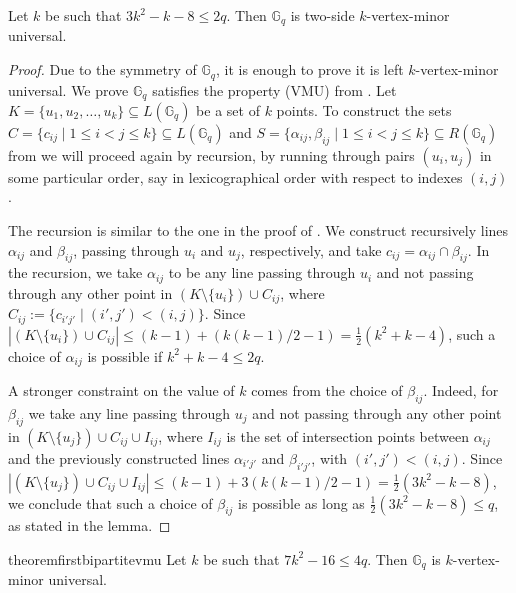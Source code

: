 \documentclass[a4paper,UKenglish,cleveref, autoref, thm-restate]{arxiv}
\newcommand{\ls}{\leqslant}
\newcommand{\G}[1][q]{\mathbb{G}_{#1}}
\begin{document}
\begin{theorem}\label{theo:bipartite-kvmu}
    Let $k$ be such that $3k^2-k-8 \ls 2q$. Then $\G$ is two-side  $k$-vertex-minor universal.
\end{theorem}

\begin{proof}
    Due to the symmetry of $\G$, it is enough to prove it is left $k$-vertex-minor universal. We prove $\G$ satisfies the property (VMU) from . Let  $K = \{u_1, u_2, \dots, u_k\} \subseteq L(\G)$ be a set of $k$  points. To construct the sets
    $C = \{c_{ij} \mid 1 \ls i < j \ls k \} \subseteq L(\G)$ and
    $S = \{\alpha_{ij},\beta_{ij} \mid 1 \ls i < j \ls k \} \subseteq R(\G)$ from  we will proceed again by recursion, by running through pairs $(u_i, u_j)$ in some particular order, say in lexicographical order with respect to indexes $(i,j)$.

    \medskip \noindent The recursion is similar to the one in the proof of .  We construct recursively lines $\alpha_{ij}$ and $\beta_{ij}$, passing through $u_i$ and $u_j$, respectively, and take $c_{ij} = \alpha_{ij} \cap \beta_{ij}$. In the recursion, we  take $\alpha_{ij}$ to be any line passing through $u_{i}$ and not passing through any other point in $\left(K\setminus\{u_{i}\}\right) \cup C_{ij}$, where $C_{ij} := \{ c_{i'j'} \mid (i',j') < (i,j)\}$. Since $|\left(K\setminus\{u_{i}\}\right)\cup C_{ij}| \ls (k-1) + (k(k-1)/2-1) = \frac{1}{2}(k^2+k-4)$, such a choice of $\alpha_{ij}$ is possible if  $k^2+k-4 \ls 2q$.

    \medskip \noindent A stronger constraint on the value of $k$ comes from the choice of $\beta_{ij}$. Indeed, for $\beta_{ij}$ we take any line passing through $u_{j}$ and not passing through any other point in $(K\setminus\{u_{j}\}) \cup C_{ij} \cup I_{ij}$, where $I_{ij}$ is the set of intersection points between $\alpha_{ij}$ and the previously constructed lines $\alpha_{i'j'}$ and $\beta_{i'j'}$, with $(i',j') < (i,j)$. Since $|(K\setminus\{u_{j}\}) \cup C_{ij} \cup I_{ij}| \ls (k-1) + 3(k(k-1)/2-1) = \frac{1}{2}(3k^2-k-8)$, we conclude that such a choice of $\beta_{ij}$ is possible as long as $\frac{1}{2}(3k^2-k-8) \ls q$, as stated in the lemma.
\end{proof}

\begin{restatable}{theorem}{firstbipartitevmu}
    \label{theo:bipartite-vmu}
    Let $k$ be such that $7k^2 - 16 \ls 4q$. Then $\G$ is $k$-vertex-minor universal.
\end{restatable}
\end{document}
